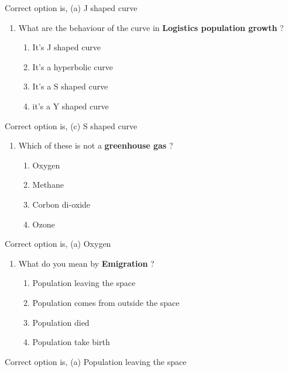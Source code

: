 \documentclass[12pt,a4paper]{article}
\begin{document}
    Correct option is, (a) J shaped curve
    \vspace*{0.5cm}

    \begin{enumerate}[label=3.]
        \item What are the behaviour of the curve in {\bf Logistics population growth} ?
        \begin{enumerate}
            \item It's J shaped curve
            \item It's a hyperbolic curve
            \item It's a S shaped curve
            \item it's a Y shaped curve
        \end{enumerate}
    \end{enumerate}

    Correct option is, (c) S shaped curve
    \vspace*{0.5cm}

    \begin{enumerate}[label=4.]
        \item Which of these is not a {\bf greenhouse gas} ?
        \begin{enumerate}
            \item Oxygen
            \item Methane
            \item Corbon di-oxide
            \item Ozone
        \end{enumerate}
    \end{enumerate}

    Correct option is, (a) Oxygen
    \vspace*{0.5cm}

    \begin{enumerate}[label=5.]
        \item What do you mean by {\bf Emigration} ?
        \begin{enumerate}
            \item Population leaving the space 
            \item Population comes from outside the space
            \item Population died
            \item Population take birth
        \end{enumerate}
    \end{enumerate}

    Correct option is, (a) Population leaving the space
\end{document}
